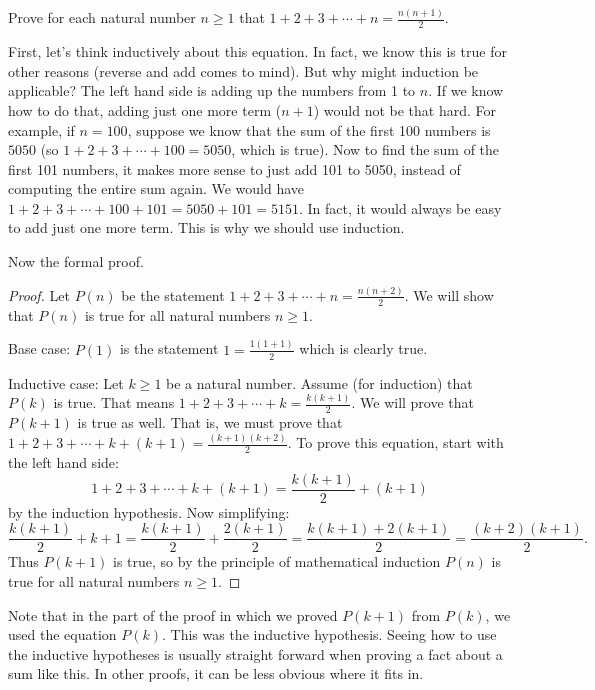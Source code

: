 \documentclass[12pt]{article}
\begin{document}
\begin{example}
  Prove for each natural number $n \ge 1$ that $1 + 2 + 3 + \cdots + n = \frac{n(n+1)}{2}$.
  
  \begin{solution}
	First, let's think inductively about this equation.  In fact, we know this is true for other reasons (reverse and add comes to mind).  But why might induction be applicable?  The left hand side is adding up the numbers from 1 to $n$.  If we know how to do that, adding just one more term ($n+1$) would not be that hard.  For example, if $n = 100$, suppose we know that the sum of the first 100 numbers is $5050$ (so $1 + 2 + 3 + \cdots + 100 = 5050$, which is true).  Now to find the sum of the first 101 numbers, it makes more sense to just add 101 to 5050, instead of computing the entire sum again.  We would have $1 + 2 + 3 + \cdots + 100 + 101 = 5050 + 101 = 5151$.  In fact, it would always be easy to add just one more term.  This is why we should use induction.  
	
	Now the formal proof.
  \begin{proof}
    Let $P(n)$ be the statement $1 + 2 + 3 + \cdots + n = \frac{n(n+2)}{2}$.  We will show that $P(n)$ is true for all natural numbers $n \ge 1$.
    
    Base case: $P(1)$ is the statement $1 = \frac{1(1+1)}{2}$ which is clearly true.
    
    Inductive case: Let $k \ge 1$ be a natural number.  Assume (for induction) that $P(k)$ is true.  That means $1 + 2 + 3 + \cdots + k = \frac{k(k+1)}{2}$.  We will prove that $P(k+1)$ is true as well.  That is, we must prove that $1 + 2 + 3 + \cdots + k + (k+1) = \frac{(k+1)(k+2)}{2}$.  To prove this equation, start with the left hand side:
    \[1 + 2 + 3 + \cdots + k + (k+1) = \frac{k(k+1)}{2} + (k+1)\]
    by the induction hypothesis.  Now simplifying:
    \[\frac{k(k+1)}{2} + k+1 = \frac{k(k+1)}{2} + \frac{2(k+1)}{2} = \frac{k(k+1) + 2(k+1)}{2} = \frac{(k+2)(k+1)}{2}.\]
    Thus $P(k+1)$ is true, so by the principle of mathematical induction $P(n)$ is true for all natural numbers $n \ge 1$.
  \end{proof}
  
    \end{solution}
\end{example}

 Note that in the part of the proof in which we proved $P(k+1)$ from $P(k)$, we used the equation $P(k)$.  This was the inductive hypothesis.  Seeing how to use the inductive hypotheses is usually straight forward when proving a fact about a sum like this.  In other proofs, it can be less obvious where it fits in.
 
\end{document}
